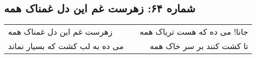 \begin{center}
\section*{شماره ۶۴: زهرست غم این دل غمناک همه}
\label{sec:064}
\begin{longtable}{l p{0.5cm} r}
زهرست غم این دل غمناک همه
&&
جانا! می ده که هست تریاک همه
\\
می ده به لب کشت که بسیار نماند
&&
تا کشت کنند بر سر خاک همه
\\
\end{longtable}
\end{center}
